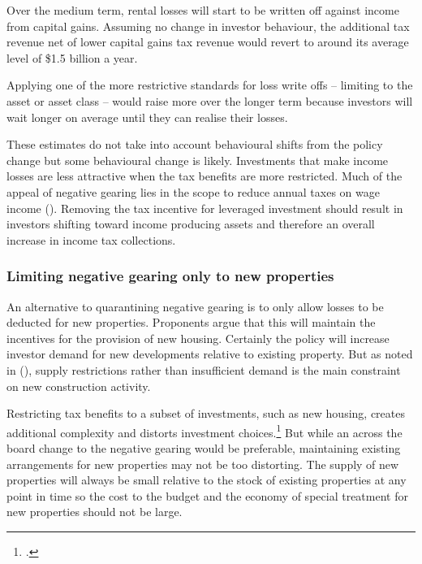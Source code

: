 \documentclass{grattan}\usepackage[]{graphicx}\usepackage[]{color}
\begin{document}
Over the medium term, rental losses will start to be written off against income from capital gains. Assuming no change in investor behaviour, the additional tax revenue net of lower capital gains tax revenue would revert to around its average level of \$1.5 billion a year. 

Applying one of the more restrictive standards for loss write offs -- limiting to the asset or asset class -- would raise more over the longer term because investors will wait longer on average until they can realise their losses. 

These estimates do not take into account behavioural shifts from the policy change but some behavioural change is likely. Investments that make income losses are less attractive when the tax benefits are more restricted. Much of the appeal of negative gearing lies in the scope to reduce annual taxes on wage income (). Removing the tax incentive for leveraged investment should result in investors shifting toward income producing assets and therefore an overall increase in income tax collections.  
\subsubsection{Limiting negative gearing only to new properties}
An alternative to quarantining negative gearing is to only allow losses to be deducted for new properties. 
Proponents argue that this will maintain the incentives for the provision of new housing.  Certainly the policy will increase investor demand for new developments relative to existing property. But as noted in (), supply restrictions rather than insufficient demand is the main constraint on new construction activity. 

Restricting tax benefits to a subset of investments, such as new housing, creates additional complexity and distorts investment choices.\footcite[p.~28]{McKell}  But while an across the board change to the negative gearing would be preferable, maintaining existing arrangements for new properties may not be too distorting. The supply of new properties will always be small relative to the stock of existing properties at any point in time  so the cost to the budget and the economy of special treatment for new properties should not be large. 
\end{document}
